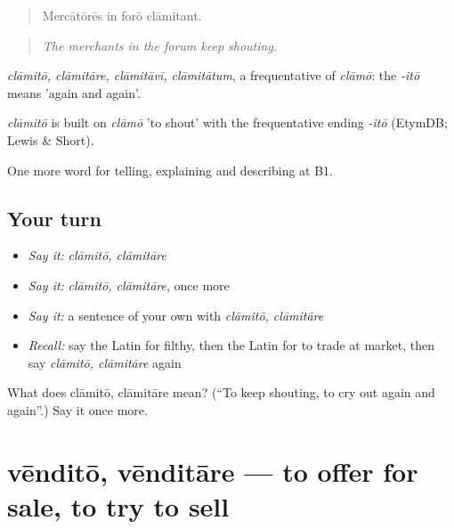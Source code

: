 \begin{quote}
Mercātōrēs in forō clāmitant.
\end{quote}

\begin{quote}
\emph{The merchants in the forum keep shouting.}
\end{quote}

\emph{clāmitō, clāmitāre, clāmitāvī, clāmitātum}, a frequentative of \emph{clāmō}: the \emph{-itō} means 'again and again'.

\begin{cousinweb}
\emph{clāmitō} is built on \emph{clāmō} 'to shout' with the frequentative ending \emph{-itō} (EtymDB; Lewis \& Short).
\end{cousinweb}

\begin{grammarlens}[title={What you've built}]
One more word for telling, explaining and describing at B1.
\end{grammarlens}

\subsection*{Your turn}
\begin{itemize}
\raggedright
  \item \emph{Say it:} \emph{clāmitō, clāmitāre}
  \item \emph{Say it:} \emph{clāmitō, clāmitāre}, once more
  \item \emph{Say it:} a sentence of your own with \emph{clāmitō, clāmitāre}
  \item \emph{Recall:} say the Latin for filthy, then the Latin for to trade at market, then say \emph{clāmitō, clāmitāre} again
\end{itemize}

\begin{tcolorbox}[breakable,colback=teal!4,colframe=teal!35!black,title={Before you move on}]
What does clāmitō, clāmitāre mean? (\textquotedblleft{}To keep shouting, to cry out again and again\textquotedblright{}.) Say it once more.
\end{tcolorbox}
\section[vēnditō, vēnditāre]{vēnditō, vēnditāre — to offer for sale, to try to sell}

\label{lesson:LA-C462-vendito}



